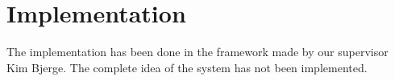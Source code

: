 
\section{Implementation}
\label{sec:impl}
The implementation has been done in the framework made by our supervisor Kim Bjerge. The complete idea of the system has not been implemented.  


\FloatBarrier